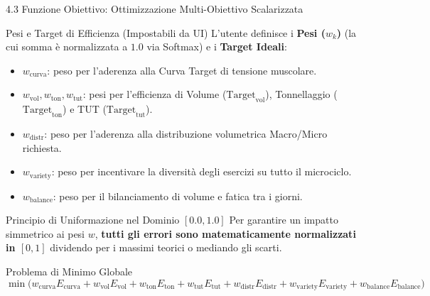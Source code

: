 \documentclass[aspectratio=169, 10pt]{beamer}
\begin{document}
\begin{frame}{4.3 Funzione Obiettivo: Ottimizzazione Multi-Obiettivo Scalarizzata}
    \begin{block}{Pesi e Target di Efficienza (Impostabili da UI)}
        \footnotesize
        L'utente definisce i \textbf{Pesi ($w_k$)} (la cui somma è normalizzata a $1.0$ via Softmax) e i \textbf{Target Ideali}:
        \begin{itemize}
            \item $w_{\mathrm{curva}}$: peso per l'aderenza alla Curva Target di tensione muscolare.
            \item $w_{\mathrm{vol}}, w_{\mathrm{ton}}, w_{\mathrm{tut}}$: pesi per l'efficienza di Volume ($\mathrm{Target}_{\mathrm{vol}}$), Tonnellaggio ($\mathrm{Target}_{\mathrm{ton}}$) e TUT ($\mathrm{Target}_{\mathrm{tut}}$).
            \item $w_{\mathrm{distr}}$: peso per l'aderenza alla distribuzione volumetrica Macro/Micro richiesta.
            \item $w_{\mathrm{variety}}$: peso per incentivare la diversità degli esercizi su tutto il microciclo.
            \item $w_{\mathrm{balance}}$: peso per il bilanciamento di volume e fatica tra i giorni.
        \end{itemize}
    \end{block}
    \vspace{-0.1cm}
    \begin{alertblock}{Principio di Uniformazione nel Dominio $[0.0, 1.0]$}
        \footnotesize
        Per garantire un impatto simmetrico ai pesi $w$, \textbf{tutti gli errori sono matematicamente normalizzati in $[0, 1]$} dividendo per i massimi teorici o mediando gli scarti.
    \end{alertblock}
    \vspace{-0.1cm}
    \begin{exampleblock}{Problema di Minimo Globale}
        $$\min \Big( w_{\mathrm{curva}} E_{\mathrm{curva}} + w_{\mathrm{vol}} E_{\mathrm{vol}} + w_{\mathrm{ton}} E_{\mathrm{ton}} + w_{\mathrm{tut}} E_{\mathrm{tut}} + w_{\mathrm{distr}} E_{\mathrm{distr}} + w_{\mathrm{variety}} E_{\mathrm{variety}} + w_{\mathrm{balance}} E_{\mathrm{balance}} \Big)$$
    \end{exampleblock}
\end{frame}
\end{document}
